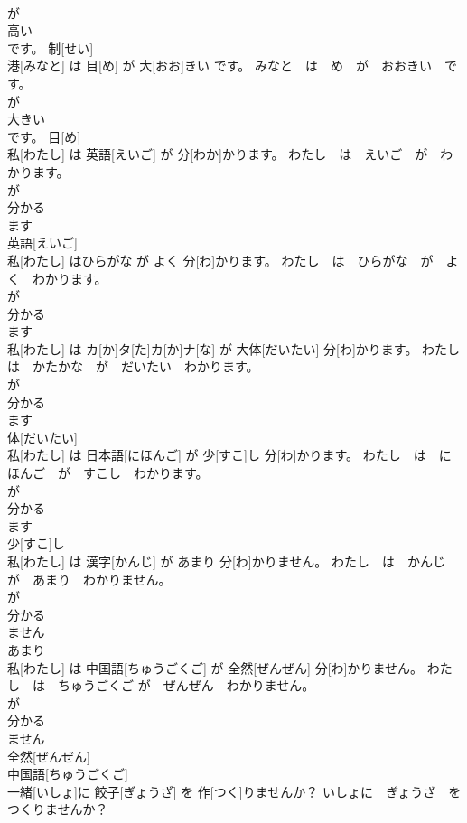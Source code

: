 \documentclass[8pt]{extreport}
\begin{document}
\begin{CJK}{UTF8}{min}
\\	が 
\\	高い 
\\	です。	制[せい] 
\\	港[みなと] は 目[め] が 大[おお]きい です。	みなと　は　め　が　おおきい　です。	
\\	が 
\\	大きい 
\\	です。	目[め] 
\\	私[わたし] は 英語[えいご] が 分[わか]かります。	わたし　は　えいご　が　わかります。	
\\	が 
\\	分かる 
\\	ます 
\\	英語[えいご] 
\\	私[わたし] はひらがな が よく 分[わ]かります。	わたし　は　ひらがな　が　よく　わかります。	
\\	が 
\\	分かる 
\\	ます 
\\	私[わたし] は カ[か]タ[た]カ[か]ナ[な] が 大体[だいたい] 分[わ]かります。	わたし　は　かたかな　が　だいたい　わかります。	
\\	が 
\\	分かる 
\\	ます 
\\	体[だいたい] 
\\	私[わたし] は 日本語[にほんご] が 少[すこ]し 分[わ]かります。	わたし　は　にほんご　が　すこし　わかります。	
\\	が 
\\	分かる 
\\	ます 
\\	少[すこ]し 
\\	私[わたし] は 漢字[かんじ] が あまり 分[わ]かりません。	わたし　は　かんじ　が　あまり　わかりません。	
\\	が 
\\	分かる 
\\	ません 
\\	あまり 
\\	私[わたし] は 中国語[ちゅうごくご] が 全然[ぜんぜん] 分[わ]かりません。	わたし　は　ちゅうごくご が　ぜんぜん　わかりません。	
\\	が 
\\	分かる 
\\	ません 
\\	全然[ぜんぜん] 
\\	中国語[ちゅうごくご] 
\\	一緒[いしょ]に 餃子[ぎょうざ] を 作[つく]りませんか？	いしょに　ぎょうざ　を　つくりませんか？	

\end{CJK}
\end{document}
